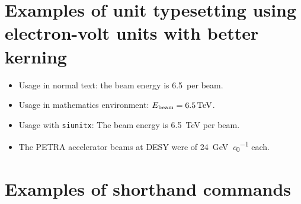 \section{Examples of unit typesetting using electron-volt units with better kerning}
\begin{itemize}
\item Usage in normal text: the beam energy is 6.5~\TeV per beam.
\item Usage in mathematics environment: ${E_{\text{beam}} = 6.5\,\text{T\kern-0.1ex \text{e\kern-0.15ex V}}}$.
\item Usage with \texttt{siunitx}: The beam energy is \qty{6.5}{\TeV} per beam.
\item The PETRA accelerator beams at DESY were of \qty{24}{\GeV\per\clight} each.
\end{itemize}

\section{Examples of shorthand commands}

